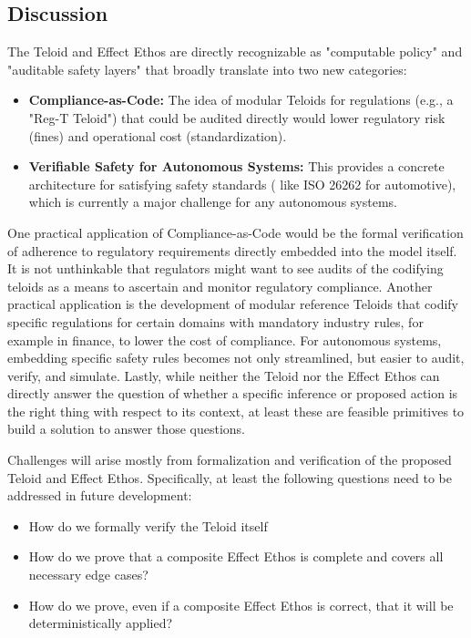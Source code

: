 \subsection{Discussion}

The Teloid and Effect Ethos are directly recognizable as "computable policy" and "auditable safety
layers" that broadly translate into two new categories:

\begin{itemize}
  \item \textbf{Compliance-as-Code:} The idea of modular Teloids for regulations (e.g., a "Reg-T Teloid") that could be audited
  directly would lower regulatory risk (fines) and operational cost (standardization).
  \item \textbf{Verifiable Safety for Autonomous Systems:} This provides a concrete architecture for satisfying safety standards (
  like ISO 26262 for automotive), which is currently a major challenge for any autonomous systems.
\end{itemize}


One practical application of Compliance-as-Code would be the formal verification of adherence to regulatory requirements
directly embedded into the model itself. It is not unthinkable that regulators might want to see audits of the codifying
teloids as a means to ascertain and monitor regulatory compliance. Another practical application is the development of
modular reference Teloids that codify specific regulations for certain domains with mandatory industry rules,
for example in finance, to lower the cost of compliance. For autonomous systems, embedding specific safety rules
becomes not only streamlined, but easier to audit, verify, and simulate. Lastly, while neither the Teloid nor the Effect
Ethos can directly answer the question of whether a specific inference or proposed action is the right thing
with respect to its context, at least these are feasible primitives to build a solution to answer those questions.

Challenges will arise mostly from formalization and verification of the proposed Teloid and Effect Ethos. Specifically,
at least the following questions need to be addressed in future development:

\begin{itemize}
    \item How do we formally verify the Teloid itself
    \item How do we prove that a composite Effect Ethos is complete and covers all necessary edge cases?
    \item How do we prove, even if a composite Effect Ethos is correct, that it will be deterministically applied?
\end{itemize}

